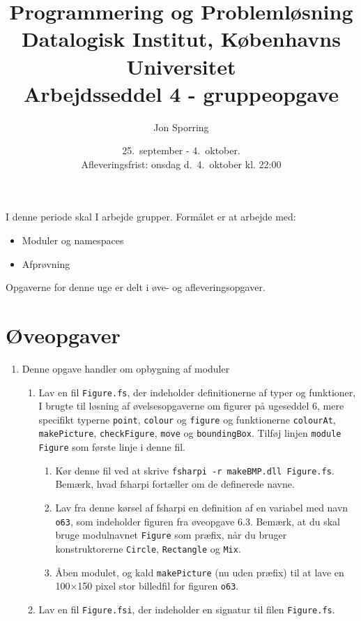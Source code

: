 \documentclass[a4paper,12pt]{article}
\title{Programmering og Problemløsning\\Datalogisk Institut,
  Københavns Universitet\\Arbejdsseddel 4 - gruppeopgave}
\author{Jon Sporring}
\date{25.\ september - 4.\ oktober.\\Afleveringsfrist: onsdag d.\ 4.\ oktober kl. 22:00}
\begin{document}
\maketitle

I denne periode skal I arbejde grupper. Formålet er at arbejde med:
\begin{itemize}
\item Moduler og namespaces
\item Afprøvning
\end{itemize}
 
Opgaverne for denne uge er delt i øve- og afleveringsopgaver. 

\section*{Øveopgaver}
\begin{enumerate}[label=4ø.\arabic*,start=0]
\item Denne opgave handler om opbygning af moduler
  \begin{enumerate}
  \item Lav en fil \texttt{Figure.fs}, der indeholder definitionerne af typer og funktioner, I brugte til løsning af øvelsesopgaverne om figurer på ugeseddel 6, mere specifikt typerne \texttt{point}, \texttt{colour} og \texttt{figure} og funktionerne \texttt{colourAt}, \texttt{makePicture}, \texttt{checkFigure}, \texttt{move} og \texttt{boundingBox}.  Tilføj linjen \texttt{module Figure} som første linje i denne fil.
    \begin{enumerate}
    \item Kør denne fil ved at skrive \texttt{fsharpi -r makeBMP.dll Figure.fs}.  Bemærk, hvad fsharpi fortæller om de definerede navne.
      
    \item Lav fra denne kørsel af fsharpi en definition af en variabel med navn \texttt{o63}, som indeholder figuren fra øveopgave 6.3.  Bemærk, at du skal bruge modulnavnet \texttt{Figure} som præfix, når du bruger konstruktorerne \texttt{Circle}, \texttt{Rectangle} og \texttt{Mix}.
      
    \item Åben modulet, og kald \texttt{makePicture} (nu uden præfix) til at lave en 100×150 pixel stor billedfil for figuren \texttt{o63}.
    \end{enumerate}
    
  \item Lav en fil \texttt{Figure.fsi}, der indeholder en signatur til filen \texttt{Figure.fs}.
    

\end{enumerate}
\end{enumerate}
\end{document}
